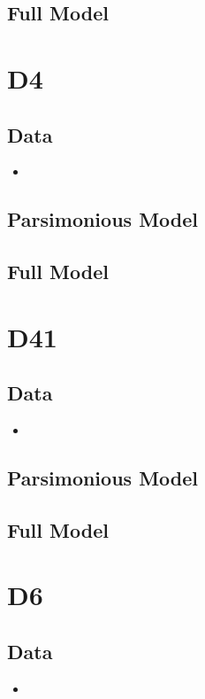 \documentclass[12pt]{amsart}
\begin{document}
\subsection{Full Model}

\section{D4}
\subsection{Data}
\begin{itemize}
\item
\end{itemize}
\subsection{Parsimonious Model}

\subsection{Full Model}

\section{D41}
\subsection{Data}
\begin{itemize}
\item
\end{itemize}
\subsection{Parsimonious Model}

\subsection{Full Model}

\section{D6}
\subsection{Data}
\begin{itemize}
\item
\end{itemize}
\end{document}
